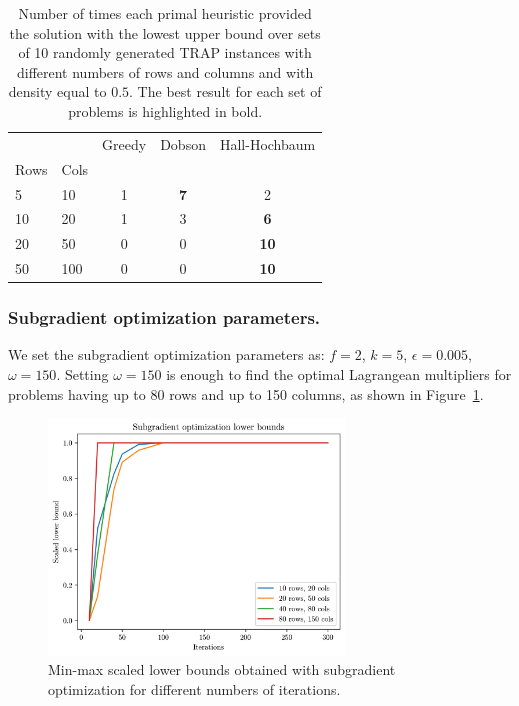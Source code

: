 \documentclass[runningheads]{llncs}
\begin{document}
\begin{table}
  \caption{Number of times each primal heuristic provided the solution with the lowest upper bound over sets of 10 randomly generated TRAP instances with different numbers of rows and columns and with density equal to $0.5$. The best result for each set of problems is highlighted in bold.}
  \label{tab:results:primal}
  \centering
  \begin{tabular}{llccc}
  \toprule
   &  & Greedy & Dobson & Hall-Hochbaum \\
  Rows & Cols &  &  &  \\
  \midrule
  5 & 10 & 1 & \bfseries 7 & 2 \\
  10 & 20 & 1 & 3 & \bfseries 6 \\
  20 & 50 & 0 & 0 & \bfseries 10 \\
  50 & 100 & 0 & 0 & \bfseries 10 \\
  \bottomrule
  \end{tabular}
  \end{table}

\subsubsection{Subgradient optimization parameters.} We set the subgradient optimization parameters as: $f=2$, $k=5$, $\epsilon=0.005$, $\omega=150$. Setting $\omega=150$ is enough to find the optimal Lagrangean multipliers for problems having up to 80 rows and up to 150 columns, as shown in Figure~\ref{fig:results:subgrad}.

\begin{figure}
  \center
  \includegraphics[width=0.7\textwidth]{img/subgrad_lb.png}
  \caption{Min-max scaled lower bounds obtained with subgradient optimization for different numbers of iterations.} 
  \label{fig:results:subgrad}
\end{figure}
\end{document}
